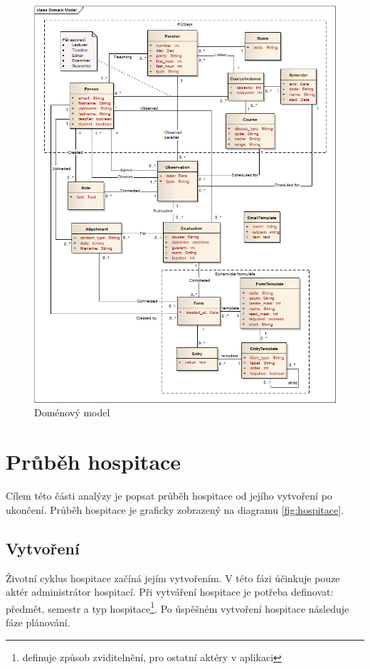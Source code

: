 \begin{figure}[p]
\begin{center}
\includegraphics[width=14cm]{figures/DomainModel2}
\caption{Doménový model}
\label{fig:domainmodel}
\end{center}
\end{figure}


\newpage 
\section{Průběh hospitace}
Cílem této části analýzy je popsat průběh hospitace od jejího vytvoření po ukončení. Průběh hospitace je graficky zobrazený na diagramu \ref{fig:hospitace}.

\subsection{Vytvoření}
Životní cyklus hospitace začíná jejím vytvořením. V této fázi účinkuje pouze aktér administrátor hospitací. Při vytváření hospitace je potřeba definovat: předmět, semestr a typ hospitace\footnote{definuje způsob zviditelnění, pro ostatní aktéry v aplikaci}. Po úspěšném vytvoření hospitace následuje fáze plánování.

